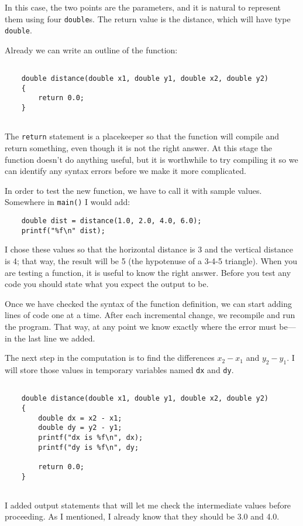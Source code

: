In this case, the two points are the parameters, and it is natural to
represent them using four {\tt double}s.  The return value is the
distance, which will have type {\tt double}.

Already we can write an outline of the function:

\begin{verbatim}

    double distance(double x1, double y1, double x2, double y2) 
    {
        return 0.0;
    }
    
\end{verbatim}
%
The {\tt return} statement is a placekeeper so that the function will
compile and return something, even though it is not the right answer.
At this stage the function doesn't do anything useful, but it is
worthwhile to try compiling it so we can identify any syntax errors
before we make it more complicated.

In order to test the new function, we have to call it with
sample values.  Somewhere in {\tt main()} I would add:

\begin{verbatim}
    double dist = distance(1.0, 2.0, 4.0, 6.0);
    printf("%f\n" dist);
\end{verbatim}
%
I chose these values so that the horizontal
distance is 3 and the vertical distance is 4; that way,
the result will be 5 (the hypotenuse of a 3-4-5 triangle).
When you are testing a function, it is useful to know the right
answer. Before you test any code you should 
state what you expect the output to be.

Once we have checked the syntax of the function definition, we
can start adding lines of code one at a time.  After each
incremental change, we recompile and run the program.  That
way, at any point we know exactly where the error must be---in
the last line we added.

The next step in the computation is to find the differences
$x_2 - x_1$ and $y_2 - y_1$.  I will store those values in
temporary variables named {\tt dx} and {\tt dy}.

\begin{verbatim}

    double distance(double x1, double y1, double x2, double y2) 
    {
        double dx = x2 - x1;
        double dy = y2 - y1;
        printf("dx is %f\n", dx);
        printf("dy is %f\n", dy;
        
        return 0.0;
    }
    
\end{verbatim}
%
I added output statements that will let me check the intermediate
values before proceeding.  As I mentioned, I already know that they
should be 3.0 and 4.0.

